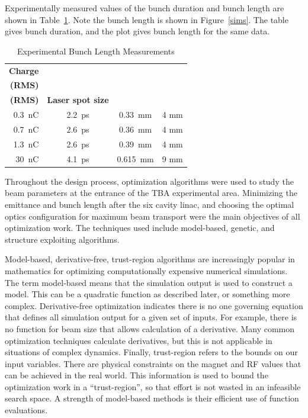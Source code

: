 Experimentally measured values of the bunch duration and bunch length are shown in Table~\ref{exp}.
Note the bunch length is shown in Figure~\ref{sims}. 
The table gives bunch duration, and the plot gives bunch length for the same data.
\begin{table}[h]
	\centering
	\caption{Experimental Bunch Length Measurements}
	\begin{tabular}{rccc}
		\toprule
		\toprule
		\textbf{Charge} & \thead{\textbf{Bunch Dur.}\\ \textbf{(RMS)}} & \thead{\textbf{Bunch Length}\\\textbf{(RMS)}} & \textbf{Laser spot size}  \\
		\midrule
		\SI{0.3}{nC} & \SI{2.2}{ps} &  \SI{0.33}{mm} & 4 mm    \\ %
		\SI{0.7}{nC} & \SI{2.6}{ps} &  \SI{0.36}{mm} & 4 mm   \\ %
		\SI{1.3}{nC} & \SI{2.6}{ps} &  \SI{0.39}{mm} & 4 mm    \\
		\SI{30}{nC}  & \SI{4.1}{ps} &  \SI{0.615}{mm} & 9 mm \\ %
		\bottomrule
	\end{tabular}
	\label{exp}
\end{table}

 \label{sec:opt}

Throughout the design process, optimization algorithms 
were used to study the beam parameters at the entrance of the TBA experimental area.
Minimizing the emittance and bunch length after the six cavity linac,
and choosing the optimal optics configuration for maximum beam transport 
were the main objectives of all optimization work.
The techniques used include model-based, genetic,
and structure exploiting algorithms. 
 
Model-based, derivative-free, trust-region algorithms 
are increasingly popular in mathematics for optimizing computationally 
expensive numerical simulations. The term model-based means 
that the simulation output is used to construct a model. 
This can be a quadratic function as described later, 
or something more complex.
Derivative-free optimization indicates there is no one 
governing equation that defines all simulation output
for a given set of inputs. For example, there is no 
function for beam size that allows calculation of a derivative. 
Many common optimization techniques calculate derivatives, 
but this is not applicable in situations of complex dynamics.
Finally, trust-region refers to the bounds on our input variables.
There are physical constraints on the magnet and RF values that 
can be achieved in the real world. This information is used 
to bound the optimization work in a ``trust-region'', so that
effort is not wasted in an infeasible search space.
A strength of model-based methods is their efficient use of function evaluations. 

